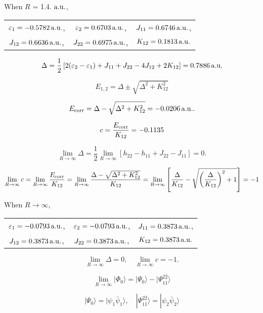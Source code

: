 \documentclass[a4paper]{book}
\newcommand{\corr}{{\rm corr}}
\newcommand{\au}{{\rm a.u.}}
\begin{document}
	\begin{solution}
	
	When $R$ = 1.4. $\au$, 
	\begin{center}
	\begin{tabular}{ccc}
		$\varepsilon_1 = -0.5782\,\au$, & $\varepsilon_2 = 0.6703\, \au$, & $J_{11} = 0.6746\,\au$, \\
		$J_{12} = 0.6636\,\au$, & $J_{22} = 0.6975\,\au$, & $K_{12} = 0.1813\,\au$
	\end{tabular}
	\end{center}
	
	\[
		\Delta = \frac{1}{2} \left[ 2( \varepsilon_2 - \varepsilon_1 ) + J_{11} + J_{22} - 4J_{12} + 2K_{12} \right] = 0.7886 \, \au
	\]
	
	\[
		E_{1,2} = \Delta \pm \sqrt{ \Delta^2 + K^2_{12} }
	\]
	
	\[
		E_\corr = \Delta - \sqrt{ \Delta^2 + K^2_{12} } = -0.0206 \, \au.
	\]
	
	\[
		c = \frac{ E_\corr }{ K_{12} } = -0.1135
	\]		
	
	\[
		\lim_{ R \rightarrow \infty} \Delta = \frac{1}{2} \lim_{ R \rightarrow \infty} \left[ h_{22} - h_{11} + J_{22} - J_{11} \right] = 0.
	\]
	
	\[
		\lim_{ R \rightarrow \infty } c = \lim_{ R \rightarrow \infty } \frac{ E_\corr }{ K_{12} } = \lim_{ R \rightarrow \infty } \frac{ \Delta - \sqrt{ \Delta^2 + K^2_{12} } }{ K_{12} } = \lim_{ R \rightarrow \infty } \left[ \frac{ \Delta }{ K_{12} } - \sqrt{ \left( \frac{ \Delta }{ K_{12} } \right)^2 + 1 } \right] = -1
	\]
	
	When $R \rightarrow \infty$, 
	\begin{center}
	\begin{tabular}{ccc}
		$\varepsilon_1 = -0.0793 \,\au$, & $\varepsilon_2 = -0.0793 \,\au$, & $J_{11} = 0.3873 \,\au$, \\
		$J_{12} = 0.3873 \,\au$, & $J_{22} = 0.3873 \,\au$, & $K_{12} = 0.3873\,\au$
	\end{tabular}
	\end{center}
	
	\[
		\lim_{ R \rightarrow \infty} \Delta = 0, \quad \lim_{ R \rightarrow \infty } c = -1.
	\]
	
	\[
		\lim_{ R \rightarrow \infty} | \Phi_0 \rangle = | \Psi_0 \rangle - | \Psi^{2 \bar{2}}_{1 \bar{1}} \rangle
	\]
	
	\[
		| \Psi_0 \rangle = | \psi_1 \bar{\psi}_1 \rangle, \quad | \Psi^{2 \bar{2}}_{1 \bar{1}} \rangle = | \psi_2 \bar{\psi}_2 \rangle
	\]
	

\end{solution}
\end{document}

